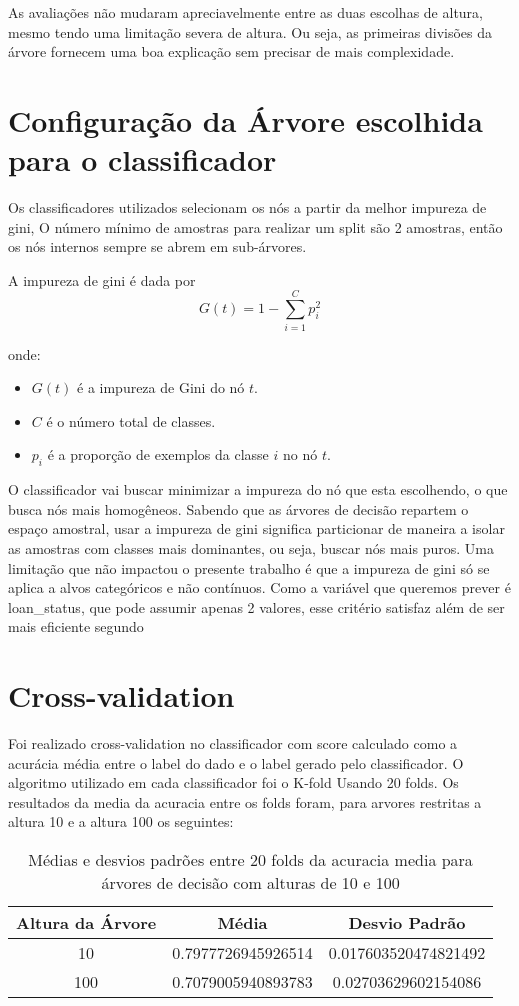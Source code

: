\documentclass[12pt]{article}
\begin{document}
As avaliações não mudaram apreciavelmente entre as duas escolhas de altura, mesmo tendo uma limitação severa de altura. Ou seja, as primeiras divisões da árvore fornecem uma boa explicação sem precisar de mais complexidade.

\section{Configuração da Árvore escolhida para o classificador}
Os classificadores utilizados selecionam os nós a partir da melhor impureza de gini, O número mínimo de amostras para realizar um split são 2 amostras, então os nós internos sempre se abrem em sub-árvores.

A impureza de gini é dada por \[
G(t) = 1 - \sum_{i=1}^{C} p_i^2
\]

onde:
\begin{itemize}
    \item \( G(t) \) é a impureza de Gini do nó \( t \).
    \item \( C \) é o número total de classes.
    \item \( p_i \) é a proporção de exemplos da classe \( i \) no nó \( t \).
\end{itemize}

O classificador vai buscar minimizar a impureza do nó que esta escolhendo, o que busca nós mais homogêneos. Sabendo que as árvores de decisão repartem o espaço amostral, usar a impureza de gini significa particionar de maneira a isolar as amostras com classes mais dominantes, ou seja, buscar nós mais puros. Uma limitação que não impactou o presente trabalho é que a impureza de gini só se aplica a alvos categóricos e não contínuos. Como a variável que queremos prever é loan\_status, que pode assumir apenas 2 valores, esse critério satisfaz além de ser mais eficiente segundo \cite{giniImpurity}

\section{Cross-validation}
Foi realizado cross-validation no classificador com score calculado como a acurácia média entre o label do dado e o label gerado pelo classificador. O algoritmo utilizado em cada classificador foi o K-fold Usando 20 folds. Os resultados da media da acuracia entre os folds foram, para arvores restritas a altura 10 e a altura 100 os seguintes:
\begin{table}[ht]
    \centering
    \begin{tabular}{|c|c|c|}
        \hline
        Altura da Árvore & Média & Desvio Padrão \\
        \hline
        10 & 0.7977726945926514 & 0.017603520474821492 \\
        100 & 0.7079005940893783 & 0.02703629602154086 \\
        \hline
    \end{tabular}
    \caption{Médias e desvios padrões entre 20 folds da acuracia media para árvores de decisão com alturas de 10 e 100}
    \label{tab:decision_tree_statistics}
\end{table}
\end{document}
